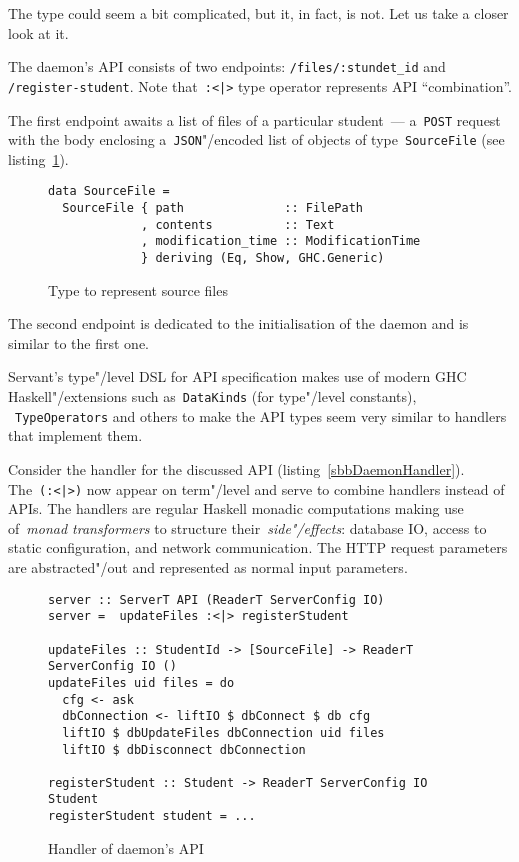 The type could seem a bit complicated, but it, in fact, is not.
Let us take a closer look at it.

The daemon's API consists of two endpoints: \lstinline{/files/:stundet_id}
and \lstinline{/register-student}. Note that~\lstinline{:<|>} type operator
represents API ``combination''.

The first endpoint awaits a list of files of a
particular student~--- a~\lstinline{POST} request with the body
enclosing a~\lstinline{JSON}"/encoded list of objects of type~\lstinline{SourceFile}
(see listing~\ref{listing:sourcefile}).

\begin{figure}[h]
\begin{lstlisting}
data SourceFile =
  SourceFile { path              :: FilePath
             , contents          :: Text
             , modification_time :: ModificationTime
             } deriving (Eq, Show, GHC.Generic)
\end{lstlisting}
\caption{Type to represent source files}
\label{listing:sourcefile}
\end{figure}

The second endpoint is dedicated to the initialisation of the daemon and is similar
to the first one.

Servant's type"/level DSL for API specification makes use of modern GHC
Haskell"/extensions such as~\lstinline{DataKinds} (for type"/level constants),
~\lstinline{TypeOperators} and others to make the API types seem very similar to handlers
that implement them.

Consider the handler for the discussed API (listing~\ref{sbbDaemonHandler}).
The~\lstinline{(:<|>)} now appear on term"/level and serve to combine handlers instead of
APIs. The handlers are regular Haskell monadic computations making
use of~\emph{monad transformers} to structure their~\emph{side"/effects}:
database IO, access to static configuration, and network communication. The HTTP
request parameters are abstracted"/out and represented as normal input parameters.

\begin{figure}[h]
\begin{lstlisting}
server :: ServerT API (ReaderT ServerConfig IO)
server =  updateFiles :<|> registerStudent

updateFiles :: StudentId -> [SourceFile] -> ReaderT ServerConfig IO ()
updateFiles uid files = do
  cfg <- ask
  dbConnection <- liftIO $ dbConnect $ db cfg
  liftIO $ dbUpdateFiles dbConnection uid files
  liftIO $ dbDisconnect dbConnection

registerStudent :: Student -> ReaderT ServerConfig IO Student
registerStudent student = ...
\end{lstlisting}
\caption{Handler of daemon's API}
\label{listing:sbbDaemonHandler}
\end{figure}

